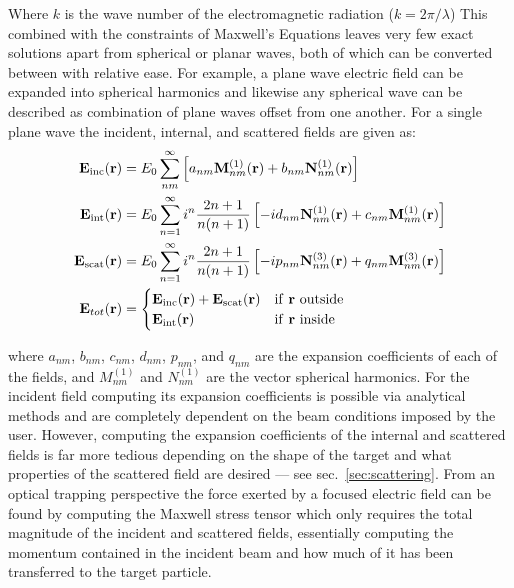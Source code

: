 Where $k$ is the wave number of the electromagnetic radiation ($k = 2\pi/\lambda$)
This combined with the constraints of Maxwell's Equations leaves 
very few exact solutions apart from spherical or planar waves, 
both of which can be converted between with relative ease. For 
example, a plane wave electric field can be expanded into spherical 
harmonics and likewise any spherical wave can be described as 
combination of plane waves offset from one another. For a single 
plane wave the incident, internal, and scattered fields are given as: 
\begin{align}
	\label{eq:incident}
	{\bf E}_{\rm inc}({\bf r})
	&=
    E_0 \sum_{nm}^\infty \left[
    a_{nm}{\bf M}_{nm}^{(1)}({\bf r})
    + b_{nm}{\bf N}_{nm}^{(1)}({\bf r})\right]
  \\
  \label{eq:internal}
  {\bf E}_{\rm int}({\bf r})
  &=
    E_0 \sum_{n=1}^\infty i^n\frac{2n+1}{n(n+1)}\left[
    -id_{nm}{\bf N}_{nm}^{(1)}({\bf r}) + c_{nm}{\bf M}_{nm}^{(1)}({\bf r})
    \right]
  \\
  \label{eq:scattered}
  {\bf E}_{\rm scat}({\bf r})
  &=
    E_0 \sum_{n=1}^\infty  i^n\frac{2n+1}{n(n+1)}\left[
      -i p_{nm}{\bf N}_{nm}^{(3)}({\bf r})+q_{nm}{\bf M}_{nm}^{(3)}({\bf r})
    \right] 
    \\
	\mathbf{E}_{tot}({\bf r}) &= 
	\begin{cases}
		{\bf E}_{\rm inc}({\bf r}) + {\bf E}_{\rm scat}({\bf r}) & \text{if \textbf{r} outside}
		\\ 
		{\bf E}_{\rm int}({\bf r}) & \text{if \textbf{r} inside}
	\end{cases}
\end{align}

where $a_{nm}$, $b_{nm}$, $c_{nm}$, $d_{nm}$, $p_{nm}$, and $q_{nm}$
are the expansion coefficients of each of the fields, and $M^{(1)}_{nm}$ 
and $N^{(1)}_{nm}$ are the vector spherical harmonics. For the incident
field computing its expansion coefficients is possible via analytical
methods and are completely dependent on the beam conditions imposed by
the user. However, computing the expansion coefficients of the
internal and scattered fields is far more tedious depending on the
shape of the target and what properties of the scattered field are
desired --- see sec.~\ref{sec:scattering}.  From an optical
trapping perspective the force exerted by a focused electric field can
be found by computing the Maxwell stress tensor which only requires
the total magnitude of the incident and scattered fields, essentially
computing the momentum contained in the incident beam and how much of
it has been transferred to the target particle. 

